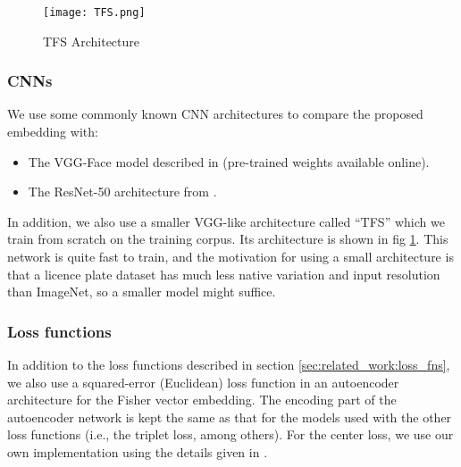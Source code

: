\documentclass[10pt,twocolumn,letterpaper]{article}
\begin{document}
            \begin{figure}
                \begin{center}
                    \texttt{[image: TFS.png]}
                    \caption{TFS Architecture}
                    \label{fig:tfs}
                \end{center}
                \end{figure}
            
        \subsubsection{CNNs \label{sec:expt:models:cnn}}
            We use some commonly known CNN architectures to compare the proposed embedding with:
            \begin{itemize}
            	\item The VGG-Face model described in \cite{ParkhiEtAl15} (pre-trained weights available online).
            	
            	
            	\item The ResNet-50 architecture from \cite{He2015}.
            \end{itemize}
            
            In addition, we also use a smaller VGG-like architecture called ``TFS'' which we train from scratch on the training corpus. Its architecture is shown in fig \ref{fig:tfs}. This network is quite fast to train, and the motivation for using a small architecture is that a licence plate dataset has much less native variation and input resolution than ImageNet, so a smaller model might suffice. 

        \subsubsection{Loss functions \label{sec:expt:models:loss}}
            In addition to the loss functions described in section \ref{sec:related_work:loss_fns}, we also use a squared-error (Euclidean) loss function in an autoencoder architecture for the Fisher vector embedding. The encoding part of the autoencoder network is kept the same as that for the models used with the other loss functions (i.e., the triplet loss, among others). For the center loss, we use our own implementation using the details given in \cite{Wen2016}.
\end{document}
